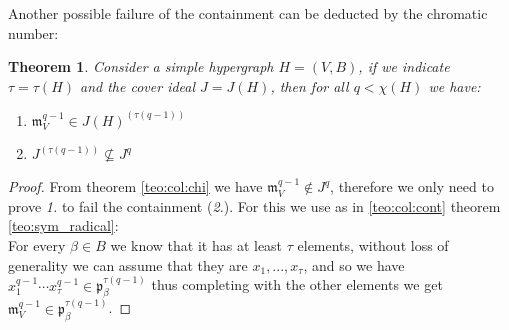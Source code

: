 \documentclass[notitlepage, a4]{book}
\theoremstyle{plain}
\newtheorem{teo}{Theorem}[section]
\theoremstyle{remark}
\theoremstyle{definition}
\newcommand{\p}{\mathfrak{p}}
\newcommand{\mm}{\mathfrak{m}}
\newcounter{que}
\begin{document}



Another possible failure of the containment can be deducted by the chromatic number:

\begin{teo} \label{teo:borin1}
	Consider a simple hypergraph $H = (V,B)$, if we indicate $\tau = \tau (H)$ and the cover ideal $ J = J(H)$,  then for all $ q < \chi(H)$ we have: 
	\begin{enumerate}
	\item $ \mm_V^{q-1} \in J(H)^{( \tau (q-1) )} $
	\item $ J^{( \tau(q-1) )} \not \subseteq J^q $
	\end{enumerate}
\end{teo}


\begin{proof}
	From theorem \ref{teo:col:chi} we have $\mm_V^{q-1} \not \in J^q$, therefore we only need to prove \textit{1.} to fail the containment (\textit{2.}). For this we use as in \ref{teo:col:cont} theorem \ref{teo:sym_radical}:\\
	For every $\beta \in B $ we know that it has at least $	\tau$ elements, without loss of generality we can assume that they are $x_1 , ... , x_\tau$, and so we have $x_1^{q-1} \cdots  x_\tau^{q-1} \in \p_\beta^{\tau(q -1)} $ thus completing with the other elements we get $\mm_V^{q-1} \in \p_\beta^{\tau(q -1)} $. 
\end{proof} 


\backmatter
\printbibliography
\end{document}
